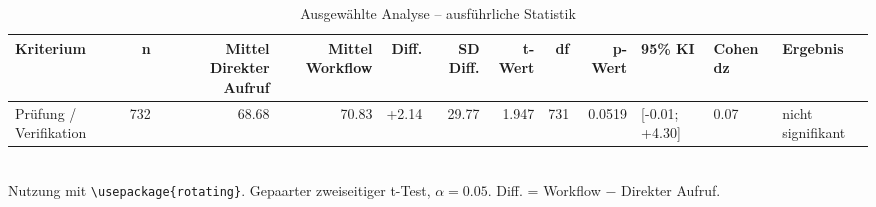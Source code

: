 \begin{table}
\centering
\caption{Ausgewählte Analyse -- ausführliche Statistik}
\begin{tabular}{lrrrrrrrrlll}
\toprule
Kriterium & n & Mittel Direkter Aufruf & Mittel Workflow & Diff. & SD Diff. & t-Wert & df & p-Wert & 95\% KI & Cohen dz & Ergebnis \\
\midrule
Prüfung / Verifikation & 732 & 68.68 & 70.83 & +2.14 & 29.77 & 1.947 & 731 & 0.0519 & [-0.01; +4.30] & 0.07 & nicht signifikant \\
\bottomrule
\end{tabular}
\\[2mm]
\footnotesize Nutzung mit \texttt{\textbackslash usepackage\{rotating\}}. Gepaarter zweiseitiger t-Test, $\alpha=0.05$. Diff. = Workflow $-$ Direkter Aufruf.
\end{table}
